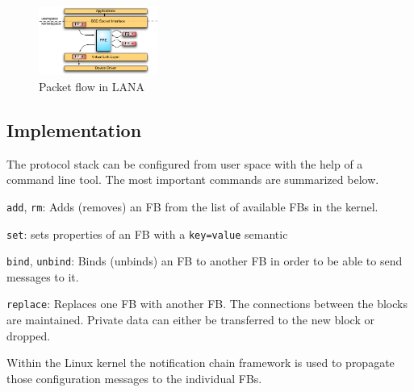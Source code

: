 \documentclass{sig-alternate}
\begin{document}

\begin{figure}
\centering
\includegraphics[width=0.35\textwidth]{figures/data_flow.pdf}
\vspace{-0.2cm}
\caption{Packet flow in LANA}
\label{fig:architecture}
\vspace{-0.4cm}
\end{figure}

\vspace{-0.15cm}
\subsection{Implementation}
The protocol stack can be configured from user space with the help of a 
command line tool. The most important commands are summarized below.
\begin{compactitem}
\item \texttt{add}, \texttt{rm}: Adds (removes) an FB from the 
      list of available FBs in the kernel. 
\item \texttt{set}: sets properties of an FB with a 
      \texttt{key=value} semantic
\item \texttt{bind}, \texttt{unbind}: Binds (unbinds) an FB 
      to another FB in order to be able to send messages to it. 
\item \texttt{replace}: Replaces one FB with another 
      FB. The connections between the blocks are maintained. 
      Private data can either be transferred to the new block or dropped.
\end{compactitem}
Within the Linux kernel the notification chain framework is used to propagate those configuration messages to the individual FBs. 
\end{document}
